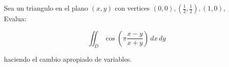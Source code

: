 Sea un triangulo en el plano \((x, y)\) con vertices \((0, 0), \left(\frac{1}{2}, \frac{1}{2}\right), (1, 0)\), Evalua:

\[
\iint_D \cos\left(\pi \frac{x-y}{x+y}\right) \, dx \, dy
\]

haciendo el cambio apropiado de variables.
